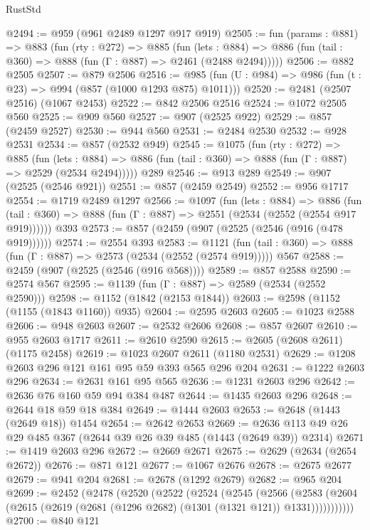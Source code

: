 \begin{lexlean}{RustStd}
\begin{coremodule}
@2494 := @959 (@961 @2489 @1297 @917 @919)
@2505 := fun (params : @881) =>
  @883
    (fun (rty : @272) =>
    @885
      (fun (lets : @884) =>
      @886 (fun (tail : @360) => @888 (fun (Γ : @887) => @2461 (@2488 @2494)))))
@2506 := @882 @2505
@2507 := @879 @2506
@2516 := @985 (fun (U : @984) => @986 (fun (t : @23) => @994 (@857 (@1000 @1293 @875) @1011)))
@2520 := @2481 (@2507 @2516) (@1067 @2453)
@2522 := @842 @2506 @2516
@2524 := @1072 @2505 @560
@2525 := @909 @560
@2527 := @907 (@2525 @922)
@2529 := @857 (@2459 @2527)
@2530 := @944 @560
@2531 := @2484 @2530
@2532 := @928 @2531
@2534 := @857 (@2532 @949)
@2545 := @1075
    (fun (rty : @272) =>
    @885
      (fun (lets : @884) =>
      @886 (fun (tail : @360) => @888 (fun (Γ : @887) => @2529 (@2534 @2494)))))
    @289
@2546 := @913 @289
@2549 := @907 (@2525 (@2546 @921))
@2551 := @857 (@2459 @2549)
@2552 := @956 @1717
@2554 := @1719 @2489 @1297
@2566 := @1097
    (fun (lets : @884) =>
    @886 (fun (tail : @360) => @888 (fun (Γ : @887) => @2551 (@2534 (@2552 (@2554 @917 @919))))))
    @393
@2573 := @857 (@2459 (@907 (@2525 (@2546 (@916 (@478 @919))))))
@2574 := @2554 @393
@2583 := @1121
    (fun (tail : @360) => @888 (fun (Γ : @887) => @2573 (@2534 (@2552 (@2574 @919)))))
    @567
@2588 := @2459 (@907 (@2525 (@2546 (@916 @568))))
@2589 := @857 @2588
@2590 := @2574 @567
@2595 := @1139 (fun (Γ : @887) => @2589 (@2534 (@2552 @2590)))
@2598 := @1152 (@1842 (@2153 @1844))
@2603 := @2598 (@1152 (@1155 (@1843 @1160)) @935)
@2604 := @2595 @2603
@2605 := @1023 @2588
@2606 := @948 @2603
@2607 := @2532 @2606
@2608 := @857 @2607
@2610 := @955 @2603 @1717
@2611 := @2610 @2590
@2615 := @2605 (@2608 @2611) (@1175 @2458)
@2619 := @1023 @2607 @2611 (@1180 @2531)
@2629 := @1208 @2603 @296 @121 @161 @95 @59 @393 @565 @296 @204
@2631 := @1222 @2603 @296
@2634 := @2631 @161 @95 @565
@2636 := @1231 @2603 @296
@2642 := @2636 @76 @160 @59 @94 @384 @487
@2644 := @1435 @2603 @296
@2648 := @2644 @18 @59 @18 @384
@2649 := @1444 @2603
@2653 := @2648 (@1443 (@2649 @18)) @1454
@2654 := @2642 @2653
@2669 := @2636 @113 @49 @26 @29 @485 @367 (@2644 @39 @26 @39 @485 (@1443 (@2649 @39)) @2314)
@2671 := @1419 @2603 @296
@2672 := @2669 @2671
@2675 := @2629 (@2634 (@2654 @2672))
@2676 := @871 @121
@2677 := @1067 @2676
@2678 := @2675 @2677
@2679 := @941 @204
@2681 := @2678 (@1292 @2679)
@2682 := @965 @204
@2699 := @2452
    (@2478
      (@2520
        (@2522
          (@2524
            (@2545
              (@2566
                (@2583
                  (@2604 (@2615 (@2619 (@2681 (@1296 @2682) (@1301 (@1321 @121)) @1331)))))))))))
@2700 := @840 @121

\end{coremodule}
\end{lexlean}
